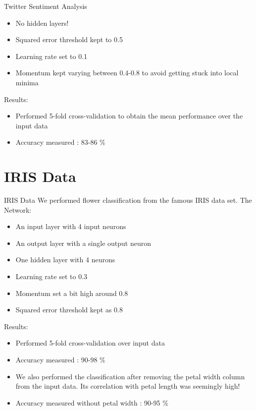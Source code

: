 \documentclass{beamer}
\begin{document}
\begin{frame}{Twitter Sentiment Analysis}

\begin{itemize}
	\item No hidden layers!
    \item Squared error threshold kept to 0.5
    \item Learning rate set to 0.1
    \item Momentum kept varying between 0.4-0.8 to avoid getting stuck into local minima
	\newline
\end{itemize}

Results:
\begin{itemize}
	\item Performed 5-fold cross-validation to obtain the mean performance over the input data
    \item Accuracy measured : 83-86 \%
\end{itemize}

\end{frame}

\section{IRIS Data}
\begin{frame}{IRIS Data}
We performed flower classification from the famous IRIS data set.
\newline
The Network:
\begin{itemize}
	\item An input layer with 4 input neurons
    \item An output layer with a single output neuron
    \item One hidden layer with 4 neurons
    \item Learning rate set to 0.3
    \item Momentum set a bit high around 0.8
    \item Squared error threshold kept as 0.8
    \newline
\end{itemize}

Results:
\begin{itemize}
	\item Performed 5-fold cross-validation over input data
    \item Accuracy measured : 90-98 \%
    \item We also performed the classification after removing the petal width column from the input data. Its correlation with petal length was seemingly high!
    \item Accuracy measured without petal width : 90-95 \%
\end{itemize}
\end{frame}
\end{document}
